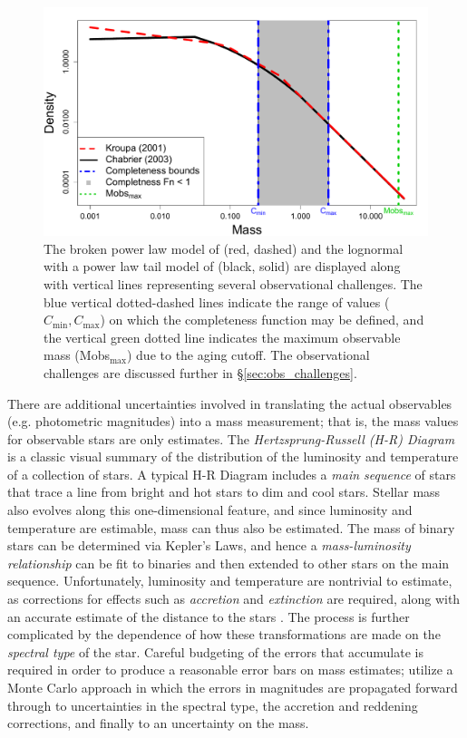 \documentclass[ejs]{imsart}
\numberwithin{equation}{section}
\theoremstyle{plain}
\begin{document}
\begin{figure}[htbp]
   \centering
\includegraphics[width = .5\textwidth]{figures/CompareOthers3.pdf} 
   \caption{The broken power law model of \cite{kroupa2001} (red, dashed) and the lognormal with a power law tail model of \cite{Chabrier:2003oq, Chabrier:2003om} (black, solid) are displayed along with vertical lines representing several observational challenges.  The blue vertical dotted-dashed lines indicate the range of values ($C_{\min}, C_{\max}$) on which the completeness function may be defined, and the vertical green dotted line indicates the maximum observable mass (Mobs$_{\max}$) due to the aging cutoff.  The observational challenges are discussed further in \S\ref{sec:obs_challenges}.}
   \label{fig:imf_models}
\end{figure}


There are additional uncertainties involved in translating the actual observables  (e.g. photometric magnitudes) into a mass measurement; that is, the mass values for observable stars are only estimates. The {\it Hertzsprung-Russell (H-R) Diagram} is a classic visual summary of the distribution of the luminosity and temperature of a collection of stars. A typical H-R Diagram includes a {\it main sequence} of stars that trace a line from bright and hot stars to dim and cool stars. Stellar mass also evolves along this one-dimensional feature, and since luminosity and temperature are estimable, mass can thus also be estimated. The mass of binary stars can be determined via Kepler's Laws, and hence a {\it mass-luminosity relationship} can be fit to binaries and then extended to other stars on the main sequence. Unfortunately, luminosity and temperature are nontrivial to estimate, as corrections for effects such as {\it accretion} and {\it extinction} are required, along with an accurate estimate of the distance to the stars \citep{Da-Rio:2010aa}. 
The process is further complicated by the dependence of how these transformations are made on the {\it spectral type} of the star. Careful budgeting of the errors that accumulate is required in order to produce a reasonable error bars on mass estimates; \cite{Da-Rio:2010aa} utilize a Monte Carlo approach in which the errors in magnitudes are propagated forward through to uncertainties in the spectral type, the accretion and reddening corrections, and finally to an uncertainty on the mass.  
\end{document}
